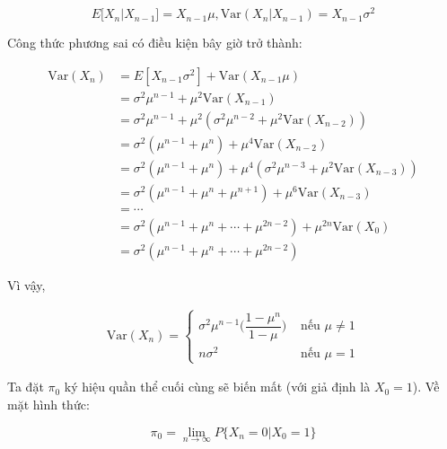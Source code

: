 \documentclass[14pt, a4paper]{article}
\numberwithin{equation}{section}
\numberwithin{figure}{section}
\theoremstyle{sltheorem}
\theoremstyle{soltheorem}
\numberwithin{dl}{section}
\numberwithin{md}{section}
\numberwithin{vd}{section}
\begin{document}
    \begin{equation*}
        E \lbrack X_n \vert X_{n-1} \rbrack = X_{n-1} \mu, \mathrm{Var} (X_n \vert X_{n-1}) = X_{n-1} \sigma^2
    \end{equation*}

    Công thức phương sai có điều kiện bây giờ trở thành:

    \begin{equation*}
        \begin{aligned}
            \mathrm{Var}(X_n) & =E[X_{n-1} \sigma^2]+\mathrm{Var}(X_{n-1} \mu) \\
            &=\sigma^2 \mu^{n-1}+\mu^2 \mathrm{Var}(X_{n-1}) \\
            &=\sigma^2 \mu^{n-1}+\mu^2(\sigma^2 \mu^{n-2}+\mu^2 \mathrm{Var}(X_{n-2})) \\
            &=\sigma^2(\mu^{n-1}+\mu^n)+\mu^4 \mathrm{Var}(X_{n-2}) \\
            &=\sigma^2(\mu^{n-1}+\mu^n)+\mu^4(\sigma^2 \mu^{n-3}+\mu^2 \mathrm{Var}(X_{n-3})) \\
            &=\sigma^2(\mu^{n-1}+\mu^n+\mu^{n+1})+\mu^6 \mathrm{Var}(X_{n-3}) \\
            &=\cdots \\
            &=\sigma^2(\mu^{n-1}+\mu^n+\cdots+\mu^{2 n-2})+\mu^{2 n} \mathrm{Var}(X_0) \\
            &=\sigma^2(\mu^{n-1}+\mu^n+\cdots+\mu^{2 n-2})
        \end{aligned}
    \end{equation*}

    Vì vậy,

    \begin{equation}
        \begin{aligned}
            \mathrm{Var} (X_n) = \begin{cases}
                \sigma^2 \mu^{n-1} \Big ( \dfrac{1 - \mu^n}{1 - \mu} \Big) &\text{ nếu } \mu \neq 1 \\
                n \sigma^2 &\text{ nếu } \mu = 1
            \end{cases}
        \end{aligned}
    \end{equation}

    Ta đặt $\pi_0$ ký hiệu quần thể cuối cùng sẽ biến mất (với giả định là $X_0=1$). Về mặt hình thức:

    \begin{equation*}
        \pi_0 = \lim_{n \rightarrow \infty} P \lbrace X_n = 0 \vert X_0 = 1 \rbrace
    \end{equation*}
\end{document}
